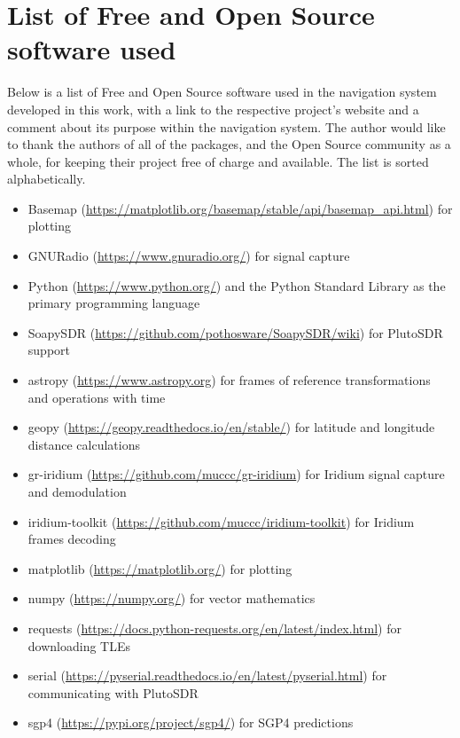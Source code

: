\chapter{List of Free and Open Source software used}
Below is a list of Free and Open Source software used in the navigation system developed in this work, with a link to the respective project's website and a comment about its purpose within the navigation system. The author would like to thank the authors of all of the packages, and the Open Source community as a whole, for keeping their project free of charge and available. The list is sorted alphabetically.

\begin{itemize}
    \item Basemap (\url{https://matplotlib.org/basemap/stable/api/basemap_api.html}) for plotting
    \item GNURadio (\url{https://www.gnuradio.org/}) for signal capture
    \item Python (\url{https://www.python.org/}) and the Python Standard Library as the primary programming language
    \item SoapySDR (\url{https://github.com/pothosware/SoapySDR/wiki}) for PlutoSDR support
    \item astropy (\url{https://www.astropy.org}) for frames of reference transformations and operations with time
    \item geopy (\url{https://geopy.readthedocs.io/en/stable/}) for latitude and longitude distance calculations
    \item gr-iridium (\url{https://github.com/muccc/gr-iridium}) for Iridium signal capture and demodulation
    \item iridium-toolkit (\url{https://github.com/muccc/iridium-toolkit}) for Iridium frames decoding
    \item matplotlib (\url{https://matplotlib.org/}) for plotting
    \item numpy (\url{https://numpy.org/}) for vector mathematics
    \item requests (\url{https://docs.python-requests.org/en/latest/index.html}) for downloading TLEs
    \item serial (\url{https://pyserial.readthedocs.io/en/latest/pyserial.html}) for communicating with PlutoSDR
    \item sgp4 (\url{https://pypi.org/project/sgp4/}) for SGP4 predictions
\end{itemize}
